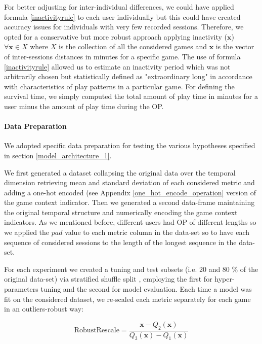 For better adjusting for inter-individual differences, we could have applied formula \ref{inactivityrule} to each user individually but this could have created accuracy issues for individuals with very few recorded sessions. Therefore, we opted for a conservative but more robust approach applying inactivity ($\mathbf{x}$) $\forall \mathbf{x} \in X$ where $X$ is the collection of all the considered games and $\mathbf{x}$ is the vector of inter-sessions distances in minutes for a specific game. The use of formula \ref{inactivityrule} allowed us to estimate an inactivity period which was not arbitrarily chosen but statistically defined as "extraordinary long" in accordance with characteristics of play patterns in a particular game. For defining the survival time, we simply computed the total amount of play time in minutes for a user minus the amount of play time during the OP.



\paragraph*{Data Preparation}
\label{data_preparation_1}
We adopted specific data preparation for testing the various hypotheses specified in section \ref{model_architecture_1}. 

We first generated a dataset collapsing the original data over the temporal dimension retrieving mean and standard deviation of each considered metric and adding a one-hot encoded (see Appendix \ref{one_hot_encode_operation} version of the game context indicator. Then we generated a second data-frame maintaining the original temporal structure and numerically encoding the game context indicators. As we mentioned before, different users had OP of different lengths so we applied the $pad$ value to each metric column in the data-set so to have each sequence of considered sessions to the length of the longest sequence in the data-set. 

For each experiment we created a tuning and test subsets (i.e. 20 and 80 \% of the original data-set) via stratified shuffle split \cite{scikit-learn}, employing the first for hyper-parameters tuning and the second for model evaluation. Each time a model was fit on the considered dataset, we re-scaled each metric separately for each game in an outliers-robust way:

\begin{equation}
\label{robustscaler}
    \text{RobustRescale}=
        \dfrac
            {\mathbf{x} - Q_2(\mathbf{x})}
            {Q_3(\mathbf{x}) - Q_1(\mathbf{x})}
\end{equation}

